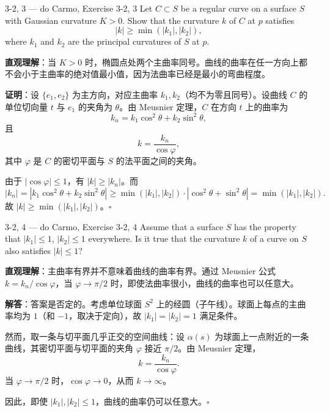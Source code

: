 \begin{exercise}{3-2, 3 — do Carmo, Exercise 3-2, 3}
Let $C \subset S$ be a regular curve on a surface $S$ with Gaussian curvature $K > 0$. Show that the curvature $k$ of $C$ at $p$ satisfies
\[
| k | \geq \min (| k _ {1} |, | k _ {2} |),
\]
where $k_{1}$ and $k_{2}$ are the principal curvatures of $S$ at $p$.
\end{exercise}

\begin{solution}
\textbf{直观理解}：当 $K > 0$ 时，椭圆点处两个主曲率同号。曲线的曲率在任一方向上都不会小于主曲率的绝对值最小值，因为法曲率已经是最小的弯曲程度。

\textbf{证明}：设 $\{e_1, e_2\}$ 为主方向，对应主曲率 $k_1, k_2$（均不为零且同号）。设曲线 $C$ 的单位切向量 $t$ 与 $e_1$ 的夹角为 $\theta$。由 Meusnier 定理，$C$ 在方向 $t$ 上的曲率为
\[
k_n = k_1 \cos^2\theta + k_2 \sin^2\theta,
\]
且
\[
k = \frac{k_n}{\cos\varphi},
\]
其中 $\varphi$ 是 $C$ 的密切平面与 $S$ 的法平面之间的夹角。

由于 $|\cos\varphi| \leq 1$，有 $|k| \geq |k_n|$。而
\[
|k_n| = |k_1 \cos^2\theta + k_2 \sin^2\theta| \geq \min(|k_1|, |k_2|) \cdot |\cos^2\theta + \sin^2\theta| = \min(|k_1|, |k_2|).
\]
故 $|k| \geq \min(|k_1|, |k_2|)$。$\square$
\end{solution}

\begin{exercise}{3-2, 4 — do Carmo, Exercise 3-2, 4}
Assume that a surface $S$ has the property that $|k_1| \leq 1$, $|k_2| \leq 1$ everywhere. Is it true that the curvature $k$ of a curve on $S$ also satisfies $|k| \leq 1$?
\end{exercise}

\begin{solution}
\textbf{直观理解}：主曲率有界并不意味着曲线的曲率有界。通过 Meusnier 公式 $k = k_n / \cos\varphi$，当 $\varphi \to \pi/2$ 时，即使法曲率很小，曲线的曲率也可以任意大。

\textbf{解答}：答案是否定的。考虑单位球面 $S^2$ 上的经圆（子午线）。球面上每点的主曲率均为 $1$（和 $-1$，取决于定向），故 $|k_1| = |k_2| = 1$ 满足条件。

然而，取一条与切平面几乎正交的空间曲线：设 $\alpha(s)$ 为球面上一点附近的一条曲线，其密切平面与切平面的夹角 $\varphi$ 接近 $\pi/2$。由 Meusnier 定理，
\[
k = \frac{k_n}{\cos\varphi}.
\]
当 $\varphi \to \pi/2$ 时，$\cos\varphi \to 0$，从而 $k \to \infty$。

因此，即使 $|k_1|, |k_2| \leq 1$，曲线的曲率仍可以任意大。$\square$
\end{solution}

